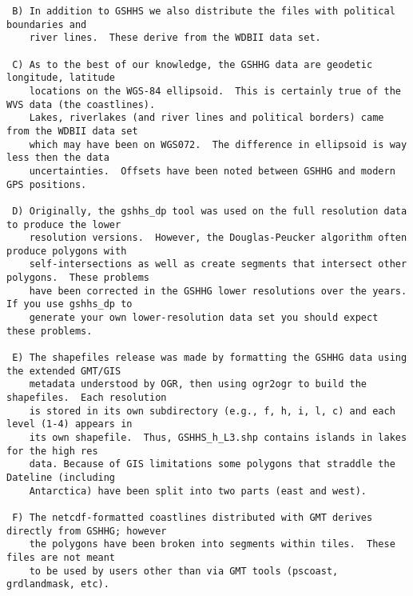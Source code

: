 {\begin{verbatim}
 B) In addition to GSHHS we also distribute the files with political boundaries and
    river lines.  These derive from the WDBII data set.

 C) As to the best of our knowledge, the GSHHG data are geodetic longitude, latitude
    locations on the WGS-84 ellipsoid.  This is certainly true of the WVS data (the coastlines).
    Lakes, riverlakes (and river lines and political borders) came from the WDBII data set
    which may have been on WGS072.  The difference in ellipsoid is way less then the data
    uncertainties.  Offsets have been noted between GSHHG and modern GPS positions.

 D) Originally, the gshhs_dp tool was used on the full resolution data to produce the lower
    resolution versions.  However, the Douglas-Peucker algorithm often produce polygons with
    self-intersections as well as create segments that intersect other polygons.  These problems
    have been corrected in the GSHHG lower resolutions over the years.  If you use gshhs_dp to
    generate your own lower-resolution data set you should expect these problems.

 E) The shapefiles release was made by formatting the GSHHG data using the extended GMT/GIS
    metadata understood by OGR, then using ogr2ogr to build the shapefiles.  Each resolution
    is stored in its own subdirectory (e.g., f, h, i, l, c) and each level (1-4) appears in
    its own shapefile.  Thus, GSHHS_h_L3.shp contains islands in lakes for the high res
    data. Because of GIS limitations some polygons that straddle the Dateline (including
    Antarctica) have been split into two parts (east and west).

 F) The netcdf-formatted coastlines distributed with GMT derives directly from GSHHG; however
    the polygons have been broken into segments within tiles.  These files are not meant
    to be used by users other than via GMT tools (pscoast, grdlandmask, etc).
\end{verbatim}
}
